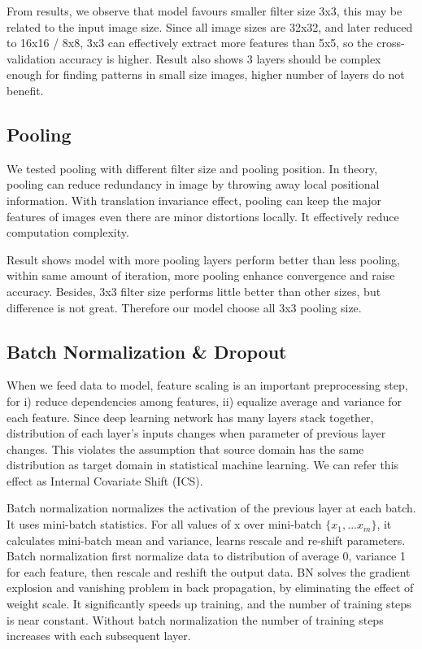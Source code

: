 \documentclass[journal,onecolumn, 12pt]{IEEEtran}
\begin{document}
From results, we observe that model favours smaller filter size 3x3, this may be related to the input image size. Since all image sizes are 32x32, and later reduced to 16x16 / 8x8, 3x3 can effectively extract more features than 5x5, so the cross-validation accuracy is higher. Result also shows 3 layers should be complex enough for finding patterns in small size images, higher number of layers do not benefit.

\subsection{Pooling}
We tested pooling with different filter size and pooling position. In theory, pooling can reduce redundancy in image by throwing away local positional information. With translation invariance effect, pooling can keep the major features of images even there are minor distortions locally. It effectively reduce computation complexity.

Result shows model with more pooling layers perform better than less pooling, within same amount of iteration, more pooling enhance convergence and raise accuracy. Besides, 3x3 filter size performs little better than other sizes, but difference is not great. Therefore our model choose all 3x3 pooling size.


\subsection{Batch Normalization \& Dropout}
When we feed data to model, feature scaling is an important preprocessing step, for i) reduce dependencies among features, ii) equalize average and variance for each feature. Since deep learning network has many layers stack together, distribution of each layer’s inputs changes when parameter of previous layer changes. This violates the assumption that source domain has the same distribution as target domain in statistical machine learning. We can refer this effect as Internal Covariate Shift (ICS). \cite{bn_paper}

Batch normalization normalizes the activation of the previous layer at each batch. It uses mini-batch statistics. For all values of x over mini-batch $\{x_1, ... x_m\}$, it calculates mini-batch mean and variance, learns rescale and re-shift parameters. Batch normalization first normalize data to distribution of average 0, variance 1 for each feature, then rescale and reshift the output data. \cite{bn_paper} BN solves the gradient explosion and vanishing problem in back propagation, by eliminating the effect of weight scale. It significantly speeds up training, and the number of training steps is near constant. Without batch normalization the number of training steps increases with each subsequent layer.
\end{document}

